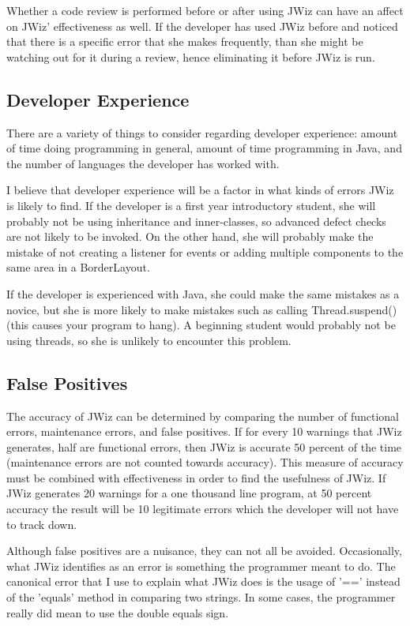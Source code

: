 Whether a code review is performed before or after using JWiz can have an
affect on JWiz' effectiveness as well.  If the developer has used JWiz
before and noticed that there is a specific error that she makes
frequently, than she might be watching out for it during a review, hence
eliminating it before JWiz is run.

\subsection{Developer Experience}
There are a variety of things to consider regarding developer experience:
amount of time doing programming in general, amount of time programming in
Java, and the number of languages the developer has worked with.

I believe that developer experience will be a factor in what kinds of
errors JWiz is likely to find.  If the developer is a first year
introductory student, she will probably not be using inheritance and
inner-classes, so advanced defect checks are not likely to be invoked.  On
the other hand, she will probably make the mistake of not creating a
listener for events or adding multiple components to the same area in a
BorderLayout.

If the developer is experienced with Java, she could make the same mistakes
as a novice, but she is more likely to make mistakes such as calling
Thread.suspend() (this causes your program to hang).  A beginning student
would probably not be using threads, so she is unlikely to encounter this
problem.

\subsection{False Positives}
The accuracy of JWiz can be determined by comparing the number of
functional errors, maintenance errors, and false positives.  If for every
10 warnings that JWiz generates, half are functional errors, then JWiz is
accurate 50 percent of the time (maintenance errors are not counted towards
accuracy).  This measure of accuracy must be combined with effectiveness in
order to find the usefulness of JWiz.  If JWiz generates 20 warnings for a
one thousand line program, at 50 percent accuracy the result will be 10
legitimate errors which the developer will not have to track down.

Although false positives are a nuisance, they can not all be avoided.
Occasionally, what JWiz identifies as an error is something the programmer
meant to do.  The canonical error that I use to explain what JWiz does is
the usage of '==' instead of the 'equals' method in comparing two strings.
In some cases, the programmer really did mean to use the double equals
sign.

